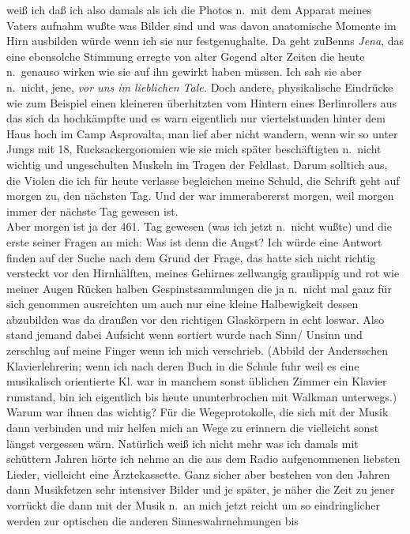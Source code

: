 \documentclass[
]{article}
\begin{document}
weiß ich daß ich also damals als ich die Photos n.~mit dem Apparat
meines Vaters aufnahm wußte was Bilder sind und was davon anatomische
Momente im Hirn ausbilden würde wenn ich sie nur festgenughalte. Da geht
zuBenns \emph{Jena}, das eine ebensolche Stimmung erregte von alter
Gegend alter Zeiten die heute n.~genauso wirken wie sie auf ihn gewirkt
haben müssen. Ich sah sie aber n.~nicht, jene, \emph{vor uns im
lieblichen Tale.} Doch andere, physikalische Eindrücke wie zum Beispiel
einen kleineren überhitzten vom Hintern eines Berlinrollers aus das sich
da hochkämpfte und es warn eigentlich nur viertelstunden hinter dem Haus
hoch im Camp Asprovalta, man lief aber nicht wandern, wenn wir so unter
Jungs mit 18, Rucksackergonomien wie sie mich später beschäftigten
n.~nicht wichtig und ungeschulten Muskeln im Tragen der Feldlast. Darum
solltich aus, die Violen die ich für heute verlasse begleichen meine
Schuld, die Schrift geht auf morgen zu, den nächsten Tag. Und der war
immerabererst morgen, weil morgen immer der nächste Tag gewesen ist.\\
Aber morgen ist ja der 461. Tag gewesen (was ich jetzt n.~nicht wußte)
und die erste seiner Fragen an mich: Was ist denn die Angst? Ich würde
eine Antwort finden auf der Suche nach dem Grund der Frage, das hatte
sich nicht richtig versteckt vor den Hirnhälften, meines Gehirnes
zellwangig graulippig und rot wie meiner Augen Rücken halben
Gespinstsammlungen die ja n.~nicht mal ganz für sich genommen
ausreichten um auch nur eine kleine Halbewigkeit dessen abzubilden was
da draußen vor den richtigen Glaskörpern in echt loswar. Also stand
jemand dabei Aufsicht wenn sortiert wurde nach Sinn/ Unsinn und
zerschlug auf meine Finger wenn ich mich verschrieb. (Abbild der
Andersschen Klavierlehrerin; wenn ich nach deren Buch in die Schule fuhr
weil es eine musikalisch orientierte Kl. war in manchem sonst üblichen
Zimmer ein Klavier rumstand, bin ich eigentlich bis heute ununterbrochen
mit Walkman unterwegs.) Warum war ihnen das wichtig? Für die
Wegeprotokolle, die sich mit der Musik dann verbinden und mir helfen
mich an Wege zu erinnern die vielleicht sonst längst vergessen wärn.
Natürlich weiß ich nicht mehr was ich damals mit schüttern Jahren hörte
ich nehme an die aus dem Radio aufgenommenen liebsten Lieder, vielleicht
eine Ärztekassette. Ganz sicher aber bestehen von den Jahren dann
Musikfetzen sehr intensiver Bilder und je später, je näher die Zeit zu
jener vorrückt die dann mit der Musik n.~an mich jetzt reicht um so
eindringlicher werden zur optischen die anderen Sinneswahrnehmungen bis
\end{document}
